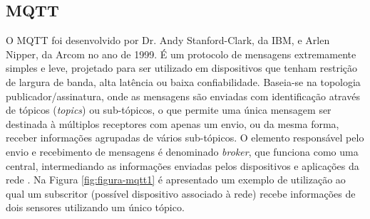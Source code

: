 \begin{alineascomponto}
                \begin{figure}[!h]
        	    \end{figure}
        \end{alineascomponto}

    \subsection{MQTT}
    \label{sec:mqtt}

        O \gls{MQTT} foi desenvolvido por Dr. Andy Stanford-Clark, da IBM, e Arlen Nipper, da Arcom no ano de 1999. É um protocolo de mensagens extremamente simples e leve, projetado para ser utilizado em dispositivos que tenham restrição de largura de banda, alta latência ou baixa confiabilidade. Baseia-se na topologia publicador/assinatura, onde as mensagens são enviadas com identificação através de tópicos (\textit{topics}) ou sub-tópicos, o que permite uma única mensagem ser destinada à múltiplos receptores com apenas um envio, ou da mesma forma, receber informações agrupadas de vários sub-tópicos. O elemento responsável pelo envio e recebimento de mensagens é denominado \textit{broker}, que funciona como uma central, intermediando as informações enviadas pelos dispositivos e aplicações da rede \cite{MQTT}. Na Figura \ref{fig:figura-mqtt1} é apresentado     um exemplo de utilização ao qual um subscritor (possível dispositivo associado à rede) recebe informações de dois sensores utilizando um único tópico.
        
